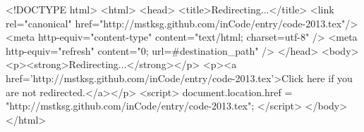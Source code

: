 <!DOCTYPE html>
<html>
<head>
<title>Redirecting...</title>
<link rel="canonical" href="http://mstksg.github.com/inCode/entry/code-2013.tex"/>
<meta http-equiv="content-type" content="text/html; charset=utf-8" />
<meta http-equiv="refresh" content="0; url=#{destination_path}" />
</head>
<body>
  <p><strong>Redirecting...</strong></p>
  <p><a href='http://mstksg.github.com/inCode/entry/code-2013.tex'>Click here if you are not redirected.</a></p>
  <script>
    document.location.href = "http://mstksg.github.com/inCode/entry/code-2013.tex";
  </script>
</body>
</html>
